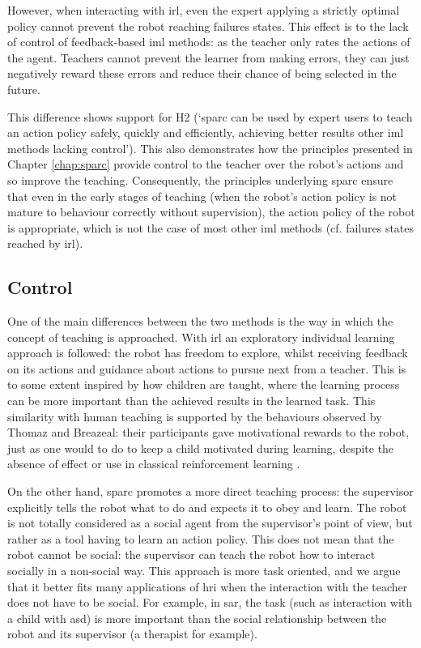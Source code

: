 However, when interacting with \gls{irl}, even the expert applying a strictly optimal policy cannot prevent the robot reaching failures states. This effect is to the lack of control of feedback-based \gls{iml} methods: as the teacher only rates the actions of the agent. Teachers cannot prevent the learner from making errors, they can just negatively reward these errors and reduce their chance of being selected in the future.

This difference shows support for H2 (`\gls{sparc} can be used by expert users to teach an action policy safely, quickly and efficiently, achieving better results other \gls{iml} methods lacking control'). This also demonstrates how the principles presented in Chapter \ref{chap:sparc} provide control to the teacher over the robot's actions and so improve the teaching. Consequently, the principles underlying \gls{sparc} ensure that even in the early stages of teaching (when the robot's action policy is not mature to behaviour correctly without supervision), the action policy of the robot is appropriate, which is not the case of most other \gls{iml} methods (cf. failures states reached by \gls{irl}).

\subsection{Control}
\label{ssec:control_control}

One of the main differences between the two methods is the way in which the concept of teaching is approached. With \gls{irl} an exploratory individual learning approach is followed: the robot has freedom to explore, whilst receiving feedback on its actions and guidance about actions to pursue next from a teacher. This is to some extent inspired by how children are taught, where the learning process can be more important than the achieved results in the learned task. This similarity with human teaching is supported by the behaviours observed by Thomaz and Breazeal: their participants gave motivational rewards to the robot, just as one would to do to keep a child motivated during learning, despite the absence of effect or use in classical reinforcement learning \citep{thomaz2008teachable}.

On the other hand, \gls{sparc} promotes a more direct teaching process: the supervisor explicitly tells the robot what to do and expects it to obey and learn. The robot is not totally considered as a social agent from the supervisor's point of view, but rather as a tool having to learn an action policy. This does not mean that the robot cannot be social: the supervisor can teach the robot how to interact socially in a non-social way. This approach is more task oriented, and we argue that it better fits many applications of \gls{hri} when the interaction with the teacher does not have to be social. For example, in \gls{sar}, the task (such as interaction with a child with \gls{asd}) is more important than the social relationship between the robot and its supervisor (a therapist for example).


